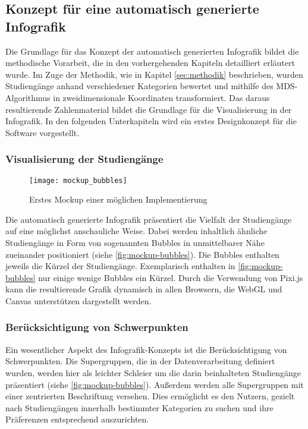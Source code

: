 \subsection{Konzept für eine automatisch generierte Infografik}\label{sec:konzept}
Die Grundlage für das Konzept der automatisch generierten Infografik bildet die methodische Vorarbeit, die in den vorhergehenden Kapiteln detailliert erläutert wurde. Im Zuge der Methodik, wie in Kapitel \ref{sec:methodik} beschrieben, wurden Studiengänge anhand verschiedener Kategorien bewertet und mithilfe des MDS-Algorithmus in zweidimensionale Koordinaten transformiert. Das daraus resultierende Zahlenmaterial bildet die Grundlage für die Visualisierung in der Infografik. In den folgenden Unterkapiteln wird ein erstes Designkonzept für die Software vorgestellt.

\subsubsection{Visualisierung der Studiengänge}

\begin{figure}[H]
    \centering
    \texttt{[image: mockup\_bubbles]}
    \caption{Erstes Mockup einer möglichen Implementierung}
    \label{fig:mockup-bubbles}
\end{figure}

Die automatisch generierte Infografik präsentiert die Vielfalt der Studiengänge
auf eine möglichst anschauliche Weise. Dabei werden inhaltlich ähnliche
Studiengänge in Form von sogenannten \glqq Bubbles\grqq{} in unmittelbarer Nähe 
zueinander positioniert (siehe \autoref{fig:mockup-bubbles}). Die Bubbles
enthalten jeweils die Kürzel der Studiengänge. Exemplarisch enthalten in
\autoref{fig:mockup-bubbles} nur einige wenige Bubbles ein Kürzel. Durch die
Verwendung von Pixi.js kann die resultierende Graﬁk dynamisch in allen Browsern,
die WebGL und Canvas unterstützen dargestellt werden.

\subsubsection{Berücksichtigung von Schwerpunkten}
Ein wesentlicher Aspekt des Infografik-Konzepts ist die Berücksichtigung von 
Schwerpunkten. Die Supergruppen, die in der Datenverarbeitung definiert wurden, 
werden hier als leichter Schleier um die darin beinhalteten Studiengänge 
präsentiert (siehe \autoref{fig:mockup-bubbles}). Außerdem werden alle
Supergruppen mit einer zentrierten Beschriftung versehen. Dies ermöglicht es den
Nutzern, gezielt nach Studiengängen innerhalb bestimmter Kategorien zu suchen
und ihre Präferenzen entsprechend auszurichten.

